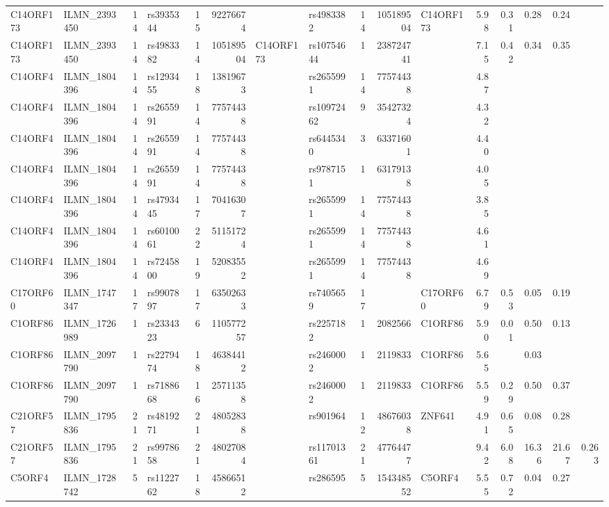 \documentclass{article}
\begin{document}
\begin{landscape}
{\begin{ThreePartTable}
\begin{longtable}{|llr|lrrl|lrrl|rrrr|r|}
C14ORF173 & ILMN\_2393450 & 14 & rs3935344 & 15 & 92276674 &  & rs4983382 & 14 & 105189504 & C14ORF173 & 5.98 & 0.31 & 0.28 & 0.24 &  \\
C14ORF173 & ILMN\_2393450 & 14 & rs4983382 & 14 & 105189504 & C14ORF173 & rs10754644 & 1 & 238724741 &  & 7.15 & 0.42 & 0.34 & 0.35 &  \\
C14ORF4 & ILMN\_1804396 & 14 & rs1293455 & 18 & 13819673 &  & rs2655991 & 14 & 77574438 &  & 4.87 &  &  &  &  \\
C14ORF4 & ILMN\_1804396 & 14 & rs2655991 & 14 & 77574438 &  & rs10972462 & 9 & 35427324 &  & 4.32 &  &  &  &  \\
C14ORF4 & ILMN\_1804396 & 14 & rs2655991 & 14 & 77574438 &  & rs6445340 & 3 & 63371601 &  & 4.40 &  &  &  &  \\
C14ORF4 & ILMN\_1804396 & 14 & rs2655991 & 14 & 77574438 &  & rs9787151 & 1 & 63179138 &  & 4.05 &  &  &  &  \\
C14ORF4 & ILMN\_1804396 & 14 & rs4793445 & 17 & 70416307 &  & rs2655991 & 14 & 77574438 &  & 3.85 &  &  &  &  \\
C14ORF4 & ILMN\_1804396 & 14 & rs6010061 & 22 & 51151724 &  & rs2655991 & 14 & 77574438 &  & 4.61 &  &  &  &  \\
C14ORF4 & ILMN\_1804396 & 14 & rs7245800 & 19 & 52083552 &  & rs2655991 & 14 & 77574438 &  & 4.69 &  &  &  &  \\
C17ORF60 & ILMN\_1747347 & 17 & rs9907897 & 17 & 63502633 &  & rs7405659 & 17 &  & C17ORF60 & 6.79 & 0.53 & 0.05 & 0.19 &  \\
C1ORF86 & ILMN\_1726989 & 1 & rs2334323 & 6 & 110577257 &  & rs2257182 & 1 & 2082566 & C1ORF86 & 5.90 & 0.01 & 0.50 & 0.13 &  \\
C1ORF86 & ILMN\_2097790 & 1 & rs2279474 & 18 & 46384412 &  & rs2460002 & 1 & 2119833 & C1ORF86 & 5.65 &  & 0.03 &  &  \\
C1ORF86 & ILMN\_2097790 & 1 & rs7188668 & 16 & 25711358 &  & rs2460002 & 1 & 2119833 & C1ORF86 & 5.59 & 0.29 & 0.50 & 0.37 &  \\
C21ORF57 & ILMN\_1795836 & 21 & rs4819271 & 21 & 48052838 &  & rs901964 & 12 & 48676038 & ZNF641 & 4.91 & 0.65 & 0.08 & 0.28 &  \\
C21ORF57 & ILMN\_1795836 & 21 & rs9978658 & 21 & 48027084 &  & rs11701361 & 21 & 47764477 &  & 9.42 & 6.08 & 16.36 & 21.67 & 0.263 \\
C5ORF4 & ILMN\_1728742 & 5 & rs1122762 & 18 & 45866512 &  & rs286595 & 5 & 154348552 & C5ORF4 & 5.55 & 0.72 & 0.04 & 0.27 &  \\

\end{longtable}
\end{ThreePartTable}}
\end{landscape}
\end{document}
